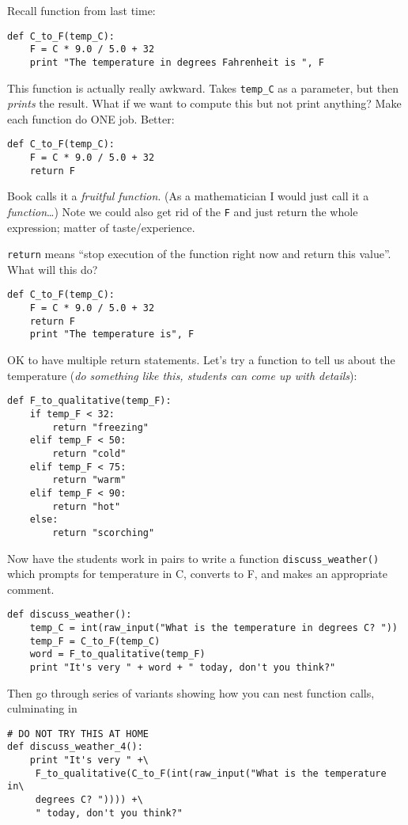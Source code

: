 \documentclass{article}
\begin{document}
Recall function from last time:
\begin{verbatim}
def C_to_F(temp_C):
    F = C * 9.0 / 5.0 + 32
    print "The temperature in degrees Fahrenheit is ", F
\end{verbatim}
This function is actually really awkward.  Takes \verb|temp_C| as a
parameter, but then \emph{prints} the result.  What if we want to
compute this but not print anything?  Make each function do ONE job.
Better:
\begin{verbatim}
def C_to_F(temp_C):
    F = C * 9.0 / 5.0 + 32
    return F
\end{verbatim}
Book calls it a \emph{fruitful function}.  (As a mathematician I would
just call it a \emph{function}\dots) Note we could also get rid of the
\verb|F| and just return the whole expression; matter of
taste/experience.

\verb|return| means ``stop execution of the function right now and
return this value''.  What will this do?

\begin{verbatim}
def C_to_F(temp_C):
    F = C * 9.0 / 5.0 + 32
    return F
    print "The temperature is", F
\end{verbatim}

OK to have multiple return statements.  Let's try a function to tell
us about the temperature (\emph{do something like this, students can
  come up with details}):
\begin{verbatim}
def F_to_qualitative(temp_F):
    if temp_F < 32:
        return "freezing"
    elif temp_F < 50:
        return "cold"
    elif temp_F < 75:
        return "warm"
    elif temp_F < 90:
        return "hot"
    else:
        return "scorching"
\end{verbatim}

Now have the students work in pairs to write a function
\verb|discuss_weather()| which prompts for temperature in C, converts
to F, and makes an appropriate comment.

\begin{verbatim}
def discuss_weather():
    temp_C = int(raw_input("What is the temperature in degrees C? "))
    temp_F = C_to_F(temp_C)
    word = F_to_qualitative(temp_F)
    print "It's very " + word + " today, don't you think?"
\end{verbatim}

Then go through series of variants showing how you can nest function
calls, culminating in

\begin{verbatim}
# DO NOT TRY THIS AT HOME
def discuss_weather_4():
    print "It's very " +\
     F_to_qualitative(C_to_F(int(raw_input("What is the temperature in\
     degrees C? ")))) +\
     " today, don't you think?"
\end{verbatim}
\end{document}
